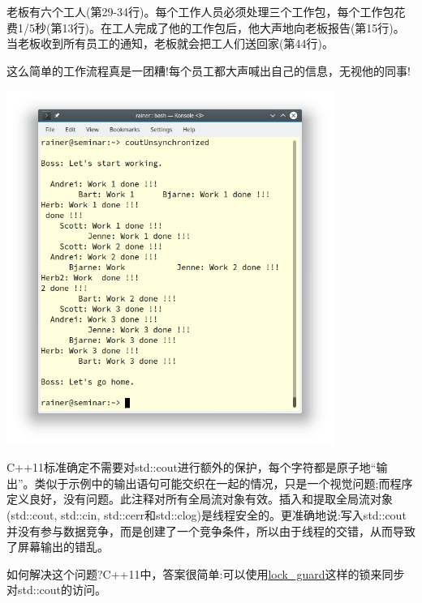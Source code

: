 老板有六个工人(第29-34行)。每个工作人员必须处理三个工作包，每个工作包花费1/5秒(第13行)。在工人完成了他的工作包后，他大声地向老板报告(第15行)。当老板收到所有员工的通知，老板就会把工人们送回家(第44行)。

这么简单的工作流程真是一团糟!每个员工都大声喊出自己的信息，无视他的同事!

\begin{center}
\includegraphics[width=0.8\textwidth]{content/3/chapter6/images/29.png}\\
\end{center}

\begin{tcolorbox}[breakable,enhanced jigsaw,colback=blue!5!white,colframe=blue!75!black,title={std::cout是线程安全的}]
	
C++11标准确定不需要对std::cout进行额外的保护，每个字符都是原子地“输出”。类似于示例中的输出语句可能交织在一起的情况，只是一个视觉问题;而程序定义良好，没有问题。此注释对所有全局流对象有效。插入和提取全局流对象(std::cout, std::cin, std::cerr和std::clog)是线程安全的。更准确地说:写入std::cout并没有参与数据竞争，而是创建了一个竞争条件，所以由于线程的交错，从而导致了屏幕输出的错乱。
	
\end{tcolorbox}

如何解决这个问题?C++11中，答案很简单:可以使用\href{https://en.cppreference.com/w/cpp/thread/lock_guard}{lock\_guard}这样的锁来同步对std::cout的访问。

